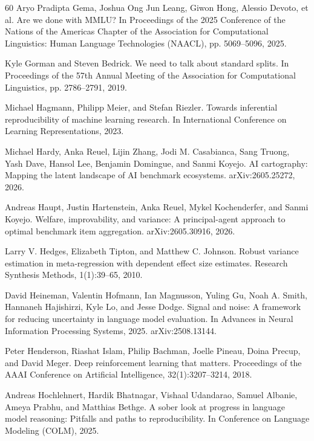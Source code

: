 \begin{thebibliography}{60}
Aryo Pradipta Gema, Joshua Ong Jun Leang, Giwon Hong, Alessio Devoto, et al. Are we done with MMLU? In Proceedings of the 2025 Conference of the Nations of the Americas Chapter of the Association for Computational Linguistics: Human Language Technologies (NAACL), pp. 5069--5096, 2025.

Kyle Gorman and Steven Bedrick. We need to talk about standard splits. In Proceedings of the 57th Annual Meeting of the Association for Computational Linguistics, pp. 2786--2791, 2019.

Michael Hagmann, Philipp Meier, and Stefan Riezler. Towards inferential reproducibility of machine learning research. In International Conference on Learning Representations, 2023.

Michael Hardy, Anka Reuel, Lijin Zhang, Jodi M. Casabianca, Sang Truong, Yash Dave, Hansol Lee, Benjamin Domingue, and Sanmi Koyejo. AI cartography: Mapping the latent landscape of AI benchmark ecosystems. arXiv:2605.25272, 2026.

Andreas Haupt, Justin Hartenstein, Anka Reuel, Mykel Kochenderfer, and Sanmi Koyejo. Welfare, improvability, and variance: A principal-agent approach to optimal benchmark item aggregation. arXiv:2605.30916, 2026.

Larry V. Hedges, Elizabeth Tipton, and Matthew C. Johnson. Robust variance estimation in meta-regression with dependent effect size estimates. Research Synthesis Methods, 1(1):39--65, 2010.

David Heineman, Valentin Hofmann, Ian Magnusson, Yuling Gu, Noah A. Smith, Hannaneh Hajishirzi, Kyle Lo, and Jesse Dodge. Signal and noise: A framework for reducing uncertainty in language model evaluation. In Advances in Neural Information Processing Systems, 2025. arXiv:2508.13144.

Peter Henderson, Riashat Islam, Philip Bachman, Joelle Pineau, Doina Precup, and David Meger. Deep reinforcement learning that matters. Proceedings of the AAAI Conference on Artificial Intelligence, 32(1):3207--3214, 2018.

Andreas Hochlehnert, Hardik Bhatnagar, Vishaal Udandarao, Samuel Albanie, Ameya Prabhu, and Matthias Bethge. A sober look at progress in language model reasoning: Pitfalls and paths to reproducibility. In Conference on Language Modeling (COLM), 2025.


\end{thebibliography}
